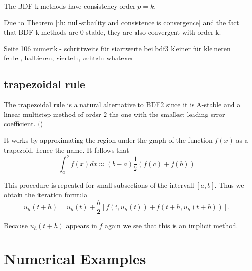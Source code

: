 	\begin{theorem}
		The BDF-k methods have consistency order $p=k$.
	\end{theorem}
	
	Due to Theorem \ref{th: null-stbaility and consistence is convergence} and the fact that BDF-k methods are $0$-stable, they are also convergent with order k.
	
	Seite 106 numerik - schrittweite für startwerte bei bdf3 kleiner für kleineren fehler, halbieren, vierteln, achteln whatever
	
\subsection{trapezoidal rule}
	\label{ch:trapezoidal rule}
	
	The trapezoidal rule is a natural alternative to BDF2 since it is A-stable and a linear multistep method of order 2 the one with the smallest leading error coefficient. (\cite{ModellingAndDiscretizationOfCircuitProblems})
	
	It works by approximating the region under the graph of the function $f(x)$ as a trapezoid, hence the name. It follows that	
	\begin{displaymath}
		\int_{a}^{b} f(x) dx \approx (b-a)\frac{1}{2} (f(a)+f(b))
	\end{displaymath}
	
	This procedure is repeated for small subsections of the intervall $[a,b]$. Thus we obtain the iteration formula
	\begin{displaymath}
		u_h (t+h) = u_h(t) +\frac{h}{2}[f(t,u_h(t)) + f(t+h, u_h(t+h))].
	\end{displaymath}
%	
	
	Because $u_h(t+h)$ appears in $f$ again we see that this is an implicit method. %
	
\section{Numerical Examples}
	
